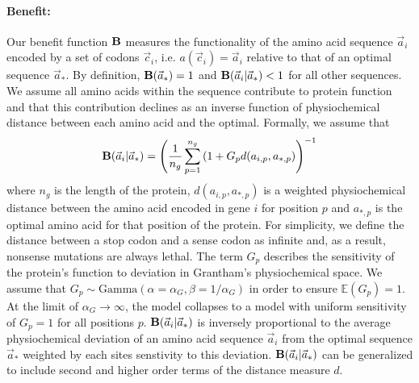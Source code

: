 \documentclass{article}
\newcommand{\EE}{\mathbb{E}} %
\newcommand{\Funcaoptvec}{\ensuremath{\Func(\aoptvec)}\xspace}
\newcommand{\Funcaveci}{\ensuremath{\Func(\aveci|\aoptvec)}\xspace}
\newcommand{\Func}{\ensuremath{\text{\textbf{B}}}\xspace}
\newcommand{\aip}{\ensuremath{a_{i,p}}\xspace}
\newcommand{\alphag}{\ensuremath{\alpha_G}\xspace}
\newcommand{\aoptp}{\ensuremath{a_{*,p}}\xspace}
\newcommand{\aoptvec}{\ensuremath{\Vec{a}_*}\xspace}
\newcommand{\aveci}{\ensuremath{\Vec{a}_i}\xspace}
\newcommand{\cveci}{\ensuremath{\cvec_i}\xspace}
\newcommand{\cvec}{\ensuremath{\Vec{c}}\xspace}
\renewcommand{\ng}{\ensuremath{{n_g}}\xspace}
\newcommand{\gp}{\ensuremath{{G_p}}\xspace}
\begin{document}
\paragraph*{Benefit: }
Our benefit function \Func measures the functionality of the amino acid sequence \aveci encoded by a set of codons \cveci, i.e. $a(\cveci) = \aveci$ relative to that of an optimal sequence $\aoptvec$.
By definition,  $\Funcaoptvec = 1$ and $\Funcaveci < 1$ for all other sequences.
We assume all amino acids within the sequence contribute to protein function and that this contribution declines as an inverse function of physiochemical distance between each amino acid and the optimal.
Formally, we assume that 
\begin{equation}
\Funcaveci = \left(\frac{1}{\ng} \sum_{p=1}^\ng \left(1 + \gp d(\aip, \aoptp\right)\right)^{-1}
\end{equation}
where $\ng$ is the length of the protein, $d(\aip, \aoptp)$ is a weighted physiochemical distance between the amino acid encoded in gene $i$ for position $p$ and $\aoptp$ is the optimal amino acid for that position of the protein.
For simplicity, we define the distance between a stop codon and a sense codon as infinite and, as a result, nonsense mutations are always lethal.
The term \gp describes the sensitivity of the protein's function to deviation in Grantham's physiochemical space.
We assume that  $\gp \sim \text{Gamma}\left(\alpha = \alphag, \beta = 1/\alphag\right)$ in order to ensure $\EE(\gp) = 1$.
At the limit of $\alphag \rightarrow \infty$, the model collapses to a model with uniform sensitivity of $\gp = 1$ for all positions $p$.
\Funcaveci is inversely proportional to the average physiochemical deviation of an amino acid sequence \aveci from the optimal sequence \aoptvec weighted by each sites senstivity to this deviation.
\Funcaveci can be generalized to include second and higher order terms of the distance measure $d$.
\end{document}
